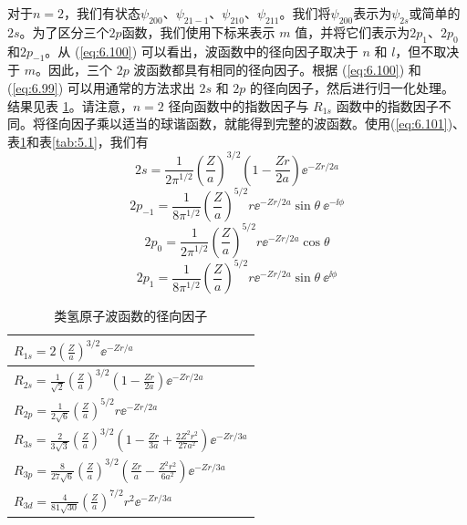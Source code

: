     对于$n=2$，我们有状态$\psi_{200}$、$\psi_{21-1}$、$\psi_{210}$、$\psi_{211}$。我们将$\psi_{200}$表示为$\psi_{2s}$或简单的$2s$。为了区分三个$2p$函数，我们使用下标来表示 $m$ 值，并将它们表示为$2p_1$、$2p_0$和$2p_{-1}$。从 (\ref{eq:6.100}) 可以看出，波函数中的径向因子取决于 $n$ 和 $l$，但不取决于 $m$。因此，三个 $2p$ 波函数都具有相同的径向因子。根据 (\ref{eq:6.100}) 和 (\ref{eq:6.99}) 可以用通常的方法求出 $2s$ 和 $2p$ 的径向因子，然后进行归一化处理。结果见表 \ref{tab:6.1}。请注意，$n=2$ 径向函数中的指数因子与 $R_{1s}$ 函数中的指数因子不同。将径向因子乘以适当的球谐函数，就能得到完整的波函数。使用(\ref{eq:6.101})、表\ref{tab:6.1}和表\ref{tab:5.1}，我们有
    \begin{equation}
        2s = \frac{1}{2\pi^{1/2}}\left(\frac{Z}{a}\right)^{3/2}\left(1 - \frac{Zr}{2a}\right)\ee ^{-Zr/2a}
        \label{eq:6.111}
    \end{equation}
    \begin{equation}
        2p_{-1} = \frac{1}{8\pi^{1/2}}\left(\frac{Z}{a}\right)^{5/2}r\ee ^{-Zr/2a}\sin\theta\:\ee ^{-\ii \phi}
        \label{eq:6.112}
    \end{equation}
    \begin{equation}
        2p_0 = \frac{1}{2\pi^{1/2}}\left(\frac{Z}{a}\right)^{5/2}r\ee ^{-Zr/2a}\cos\theta
        \label{eq:6.113}
    \end{equation}
    \begin{equation}
        2p_1 = \frac{1}{8\pi^{1/2}}\left(\frac{Z}{a}\right)^{5/2}r\ee ^{-Zr/2a}\sin\theta\:\ee ^{\ii \phi}
        \label{eq:6.114}
    \end{equation}
    \begin{table}[htbp]
        \centering
        \caption{类氢原子波函数的径向因子}
        \label{tab:6.1}
        \renewcommand{\arraystretch}{1.5}
        \begin{tabular}{l}
            \hline
            $R_{1s} = 2\left(\frac{Z}{a}\right)^{3/2}\ee ^{-Zr/a}$ \\[0.5ex]
            \hline
            $R_{2s} = \frac{1}{\sqrt{2}}\left(\frac{Z}{a}\right)^{3/2}\left(1 - \frac{Zr}{2a}\right)\ee ^{-Zr/2a}$ \\[0.5ex]
            \hline
            $R_{2p} = \frac{1}{2\sqrt{6}}\left(\frac{Z}{a}\right)^{5/2}r\ee ^{-Zr/2a}$ \\[0.5ex]
            \hline
            $R_{3s} = \frac{2}{3\sqrt{3}}\left(\frac{Z}{a}\right)^{3/2}\left(1 - \frac{Zr}{3a} + \frac{2Z^2r^2}{27a^2}\right)\ee ^{-Zr/3a}$ \\[0.5ex]
            \hline
            $R_{3p} = \frac{8}{27\sqrt{6}}\left(\frac{Z}{a}\right)^{3/2}\left(\frac{Zr}{a} - \frac{Z^2r^2}{6a^2}\right)\ee ^{-Zr/3a}$ \\[0.5ex]
            \hline
            $R_{3d} = \frac{4}{81\sqrt{30}}\left(\frac{Z}{a}\right)^{7/2}r^2\ee ^{-Zr/3a}$ \\[0.5ex]
            \hline
        \end{tabular}
    \end{table}

